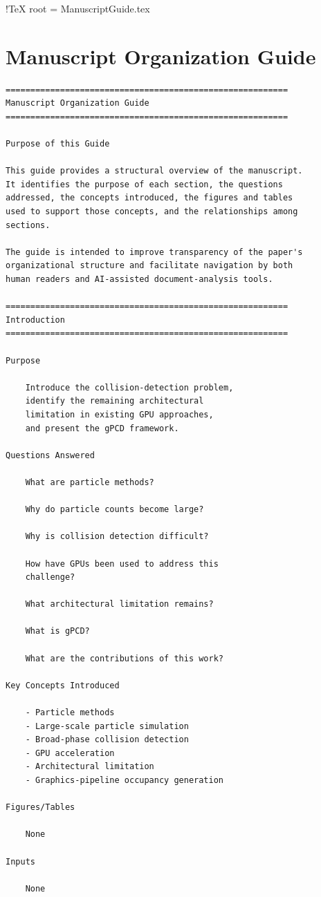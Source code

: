 !TeX root = ManuscriptGuide.tex
\newpage
\clearpage
\section{Manuscript Organization Guide}
\begin{verbatim}
=========================================================
Manuscript Organization Guide
=========================================================

Purpose of this Guide

This guide provides a structural overview of the manuscript.
It identifies the purpose of each section, the questions
addressed, the concepts introduced, the figures and tables
used to support those concepts, and the relationships among
sections.

The guide is intended to improve transparency of the paper's
organizational structure and facilitate navigation by both
human readers and AI-assisted document-analysis tools.

=========================================================
Introduction
=========================================================

Purpose

    Introduce the collision-detection problem,
    identify the remaining architectural
    limitation in existing GPU approaches,
    and present the gPCD framework.

Questions Answered

    What are particle methods?

    Why do particle counts become large?

    Why is collision detection difficult?

    How have GPUs been used to address this
    challenge?

    What architectural limitation remains?

    What is gPCD?

    What are the contributions of this work?

Key Concepts Introduced

    - Particle methods
    - Large-scale particle simulation
    - Broad-phase collision detection
    - GPU acceleration
    - Architectural limitation
    - Graphics-pipeline occupancy generation

Figures/Tables

    None

Inputs

    None


\end{verbatim}
